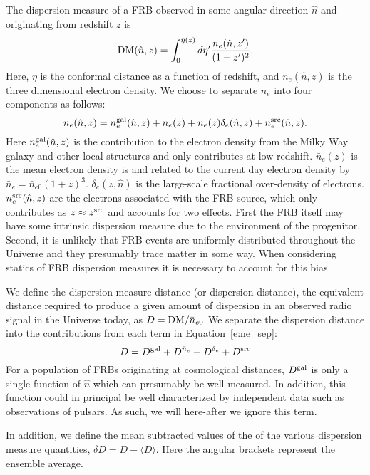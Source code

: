 \documentclass[onecolumn,prd,noshowpacs,nofootinbib,amsmath,amssymb]{revtex4}
\newcommand{\Dgal}{D^{\rm gal}}
\newcommand{\Dne}{D^{\bar{n}_e}}
\newcommand{\Dde}{D^{\delta_e}}
\newcommand{\Dsrc}{D^{\rm src}}
\newcommand{\del}{\delta\!}
\begin{document}
The dispersion measure of a FRB observed in some angular direction $\hat{n}$ and
originating from redshift $z$ is
\begin{equation}
    {\rm DM}(\hat{n}, z) = \int_0^{\eta(z)} d\eta'
        \frac{n_e(\hat{n}, z')}{(1+z')^2}.
\end{equation}
Here, $\eta$ is the conformal distance as a function of redshift, and
$n_e(\hat{n}, z)$ is the three dimensional electron density.  We choose to
separate $n_e$ into four components as follows:
\begin{equation}
\label{e:ne_sep}
n_e(\hat{n}, z) = n_e^{\rm gal}(\hat{n}, z) + \bar{n}_e(z) +
    \bar{n}_e(z)\delta_e(\hat{n}, z) + n_e^{\rm src}(\hat{n}, z).
\end{equation}
Here $n_e^{\rm gal}(\hat{n}, z)$ is the contribution to the electron density
from the Milky Way galaxy and other local structures and only contributes at
low redshift. $\bar{n}_e(z)$ is the mean electron density is and related to the
current day electron density by $\bar{n}_e = \bar{n}_{e0} (1+z)^3$. 
$\delta_e(z,\hat{n})$ is the large-scale fractional over-density of electrons.
$n_e^{\rm src}(\hat{n}, z)$ are the electrons associated with the FRB source,
which only contributes as $z \approx z^{\rm src}$ and accounts for two effects.
First the FRB itself
may have some intrinsic dispersion measure due to the environment of the
progenitor.  Second, it is unlikely that FRB events are uniformly distributed
throughout the Universe and they presumably trace matter in some way. When
considering statics of FRB dispersion measures it is necessary to account for
this bias.

We define the dispersion-measure distance (or dispersion distance),
the equivalent distance required to
produce a given amount of dispersion in an observed radio signal in the
Universe today, as $ D = {{\rm DM}}/{\bar{n}_{e0}}$
We separate the dispersion distance into the contributions from each
term in Equation~\ref{e:ne_sep}:
\begin{equation}
\label{e:D_sep}
D = \Dgal + \Dne + \Dde + \Dsrc
\end{equation}
For a population of FRBs originating at cosmological distances, $\Dgal$
is only a single function of $\hat{n}$ which can presumably be well
measured.  In addition, this function could in principal be well characterized
by independent data such as observations of pulsars.  As such, we will
here-after we ignore this term.

In addition, we define the mean subtracted values of the of the various dispersion
measure quantities, $\del D = D - \langle D \rangle$. Here the angular brackets represent
the ensemble average.
\end{document}
